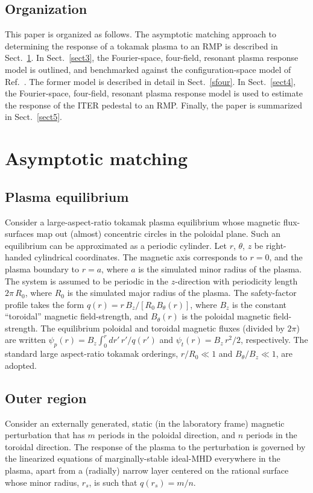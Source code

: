 \documentclass[12pt,prb,aps]{revtex4-1}
\begin{document}
\subsection{Organization}
This paper is organized as follows. The asymptotic matching approach to determining the response of a tokamak plasma to an RMP is described in Sect.~\ref{sect1}. 
In Sect.~\ref{sect3}, the Fourier-space, four-field, resonant plasma response model is outlined, and benchmarked against the configuration-space model of Ref.~. The former model is described in detail in Sect.~\ref{sfour}. In Sect.~\ref{sect4}, the Fourier-space, four-field, resonant plasma response model is used to estimate the response of the ITER pedestal to an RMP. Finally, the paper is
summarized in Sect.~\ref{sect5}. 

\section{Asymptotic matching}\label{sect1}
\subsection{Plasma equilibrium}\label{cyleq}
Consider a large-aspect-ratio tokamak plasma equilibrium whose magnetic flux-surfaces map out
(almost) concentric circles in the poloidal plane. Such an equilibrium can be approximated as a
periodic cylinder.\cite{rf1993} Let $r$, $\theta$, $z$ be right-handed cylindrical coordinates. 
The magnetic axis corresponds to $r=0$, and the plasma boundary to $r=a$, where $a$ is the simulated minor radius of the plasma. The system is assumed to be periodic in the $z$-direction with periodicity length $2\pi\,R_0$, where $R_0$ is the simulated major radius of the plasma. The
safety-factor profile takes the form $q(r)=r\,B_z/[R_0\,B_\theta(r)]$, where $B_z$ is the constant
``toroidal'' magnetic field-strength, and $B_\theta(r)$ is the poloidal magnetic field-strength. The equilibrium poloidal and toroidal magnetic
fluxes (divided by $2\pi$) are written $\psi_p(r)=B_z\int_0^r dr'\,r'/q(r')$ and $\psi_t(r)=B_z\,r^2/2$, respectively.
The standard
large aspect-ratio tokamak orderings, $r/R_0\ll 1$ and $B_\theta/B_z\ll 1$, are adopted.\cite{ric3}

\subsection{Outer region}\label{cyl}
Consider an externally generated,  static (in the laboratory frame) magnetic perturbation that has $m$ periods in the poloidal direction, and
$n$ periods in the toroidal direction. 
The response of the plasma to the perturbation is
governed by the linearized equations of marginally-stable ideal-MHD everywhere in the plasma, apart from a (radially) narrow
layer centered on the rational surface whose minor radius, $r_s$,  is such that $q(r_s)=m/n$.\cite{fkr}
\end{document}
